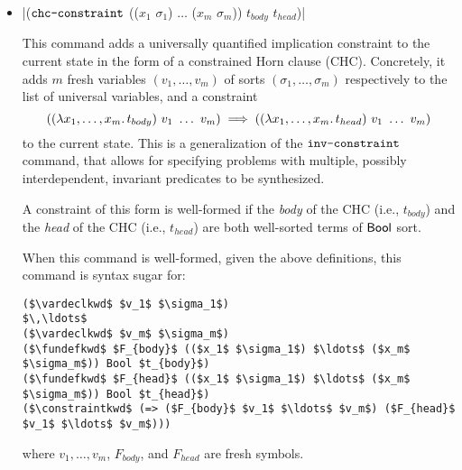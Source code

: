 \documentclass[english,a4paper,10pt]{article}
\begin{document}
\begin{itemize}
When this command is well-formed, given the above definitions,
this command is syntax sugar for:
\begin{lstlisting}[language=SyGuS-Desugar]
($\vardeclkwd$ $v_1$ $\sigma_1$)
($\vardeclkwd$ $v'_1$ $\sigma_1$)
$\,\ldots$
($\vardeclkwd$ $v_n$ $\sigma_n$)
($\vardeclkwd$ $v'_n$ $\sigma_n$)
($\constraintkwd$ (=> ($S_{pre}$ $v_1$ $\ldots$ $v_n$) ($S$ $v_1$ $\ldots$ $v_n$)))
($\constraintkwd$ (=> (and ($S$ $v_1$ $\ldots$ $v_n$) ($S_{trans}$ $v_1$ $\ldots$ $v_n$ $v'_1$ $\ldots$ $v'_n$)) ($S$ $v'_1$ $\ldots$ $v'_n$)))
($\constraintkwd$ (=> ($S$ $v_1$ $\ldots$ $v_n$) ($S_{post}$ $v_1$ $\ldots$ $v_n$)))
\end{lstlisting}
where $v_1, v'_1, \ldots, v_n, v'_n$ are fresh symbols.

\item \code|($\texttt{chc-constraint}$ (($x_1$ $\sigma_1$) $\ldots$ ($x_m$ $\sigma_m$)) $t_{body}$ $t_{head}$)|

This command adds a universally quantified implication constraint to the current state
in the form of a constrained Horn clause (CHC).
Concretely, it adds $m$ fresh variables $(v_1, \ldots, v_m)$ of sorts $(\sigma_1, \ldots, \sigma_m)$ respectively
to the list of universal variables,
and a constraint
$$
  ((\lambda x_1,\ldots,x_m \ldotp t_{body})\ v_1\ \ldots\ v_m) \implies ((\lambda x_1,\ldots,x_m \ldotp t_{head})\ v_1\ \ldots\ v_m)
$$
to the current state.
This is a generalization of the $\texttt{inv-constraint}$ command,
that allows for specifying problems with multiple, possibly interdependent,
invariant predicates to be synthesized.

A constraint of this form is well-formed if
the \emph{body} of the CHC (i.e., $t_{body}$) and the \emph{head} of the CHC (i.e., $t_{head}$)
are both well-sorted terms of $\mathsf{Bool}$ sort.

When this command is well-formed, given the above definitions,
this command is syntax sugar for:
\begin{lstlisting}[language=SyGuS-Desugar]
($\vardeclkwd$ $v_1$ $\sigma_1$)
$\,\ldots$
($\vardeclkwd$ $v_m$ $\sigma_m$)
($\fundefkwd$ $F_{body}$ (($x_1$ $\sigma_1$) $\ldots$ ($x_m$ $\sigma_m$)) Bool $t_{body}$)
($\fundefkwd$ $F_{head}$ (($x_1$ $\sigma_1$) $\ldots$ ($x_m$ $\sigma_m$)) Bool $t_{head}$)
($\constraintkwd$ (=> ($F_{body}$ $v_1$ $\ldots$ $v_m$) ($F_{head}$ $v_1$ $\ldots$ $v_m$)))
\end{lstlisting}
where $v_1, \ldots, v_m$, $F_{body}$, and $F_{head}$ are fresh symbols.

\end{itemize}
\end{document}
